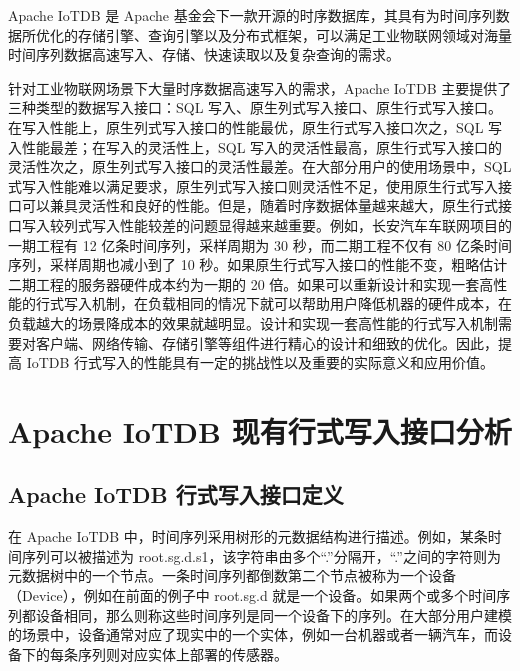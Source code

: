 Apache IoTDB 是 Apache 基金会下一款开源的时序数据库，其具有为时间序列数据所优化的存储引擎、查询引擎以及分布式框架，可以满足工业物联网领域对海量时间序列数据高速写入、存储、快速读取以及复杂查询的需求\cite{wang2023apache}。

针对工业物联网场景下大量时序数据高速写入的需求，Apache IoTDB 主要提供了三种类型的数据写入接口：SQL 写入、原生列式写入接口、原生行式写入接口。在写入性能上，原生列式写入接口的性能最优，原生行式写入接口次之，SQL 写入性能最差；在写入的灵活性上，SQL 写入的灵活性最高，原生行式写入接口的灵活性次之，原生列式写入接口的灵活性最差。在大部分用户的使用场景中，SQL 式写入性能难以满足要求，原生列式写入接口则灵活性不足，使用原生行式写入接口可以兼具灵活性和良好的性能。但是，随着时序数据体量越来越大，原生行式接口写入较列式写入性能较差的问题显得越来越重要。例如，长安汽车车联网项目的一期工程有 12 亿条时间序列，采样周期为 30 秒，而二期工程不仅有 80 亿条时间序列，采样周期也减小到了 10 秒。如果原生行式写入接口的性能不变，粗略估计二期工程的服务器硬件成本约为一期的 20 倍。如果可以重新设计和实现一套高性能的行式写入机制，在负载相同的情况下就可以帮助用户降低机器的硬件成本，在负载越大的场景降成本的效果就越明显。设计和实现一套高性能的行式写入机制需要对客户端、网络传输、存储引擎等组件进行精心的设计和细致的优化。因此，提高 IoTDB 行式写入的性能具有一定的挑战性以及重要的实际意义和应用价值。
\section{Apache IoTDB 现有行式写入接口分析}
\subsection{Apache IoTDB 行式写入接口定义}
在 Apache IoTDB 中，时间序列采用树形的元数据结构进行描述。例如，某条时间序列可以被描述为 root.sg.d.s1，该字符串由多个“.”分隔开，“.”之间的字符则为元数据树中的一个节点。一条时间序列都倒数第二个节点被称为一个设备（Device），例如在前面的例子中 root.sg.d 就是一个设备。如果两个或多个时间序列都设备相同，那么则称这些时间序列是同一个设备下的序列。在大部分用户建模的场景中，设备通常对应了现实中的一个实体，例如一台机器或者一辆汽车，而设备下的每条序列则对应实体上部署的传感器。


